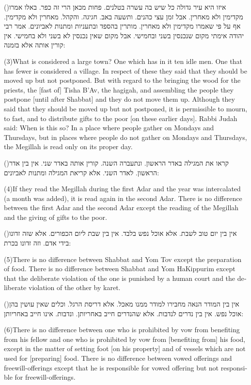 \documentclass[12pt, openany]{book}
\newcommand{\sethebfont}{
\fontsize{10.5pt}{13.1pt} \selectfont
}
\newcommand{\hebeng}[2]{
	{\sethebfont #1\\}
	
	\begin{english}
		#2
	\end{english}
}
\newcommand{\vsnum}[1]{(\hebrewnumeral{#1})\space}
\newcommand{\vsnumeng}[1]{(#1)\space}
\begin{document}
\hebeng{\vsnum{3}איזו היא עיר גדולה כל שיש בה עשרה בטלנים. פחות מכאן הרי זה כפר. באלו אמרו מקדימין ולא מאחרין. אבל זמן עצי כהנים. ותשעה באב. חגיגה. והקהל. מאחרין ולא מקדימין. אף על פי שאמרו מקדימין ולא מאחרין. מותרין בהספד ובתעניות ומתנות לאביונים. אמר רבי יהודה אימתי מקום שנכנסין בשני ובחמישי. אבל מקום שאין נכנסין לא בשני ולא בחמישי. אין קורין אותה אלא בזמנה: 
}{\vsnumeng{3}What is considered a large town? One which has in it ten idle men. One that has fewer is considered a village. In respect of these they said that they should be moved up but not postponed. But with regard to the bringing the wood for the priests, the {[fast of]} Tisha B’Av, the hagigah, and assembling the people they postpone {[until after Shabbat]} and they do not move them up. Although they said that they should be moved up but not postponed, it is permissible to mourn, to fast, and to distribute gifts to the poor {[on these earlier days]}. Rabbi Judah said: When is this so? In a place where people gather on Mondays and Thursdays, but in places where people do not gather on Mondays and Thursdays, the Megillah is read only on its proper day.}%

\hebeng{\vsnum{4}קראו את המגילה באדר הראשון. ונתעברה השנה. קורין אותה באדר שני. אין בין אדר הראשון. לאדר השני. אלא קריאת המגילה ומתנות לאביונים: 
}{\vsnumeng{4}If they read the Megillah during the first Adar and the year was intercalated (a month was added), it is read again in the second Adar. There is no difference between the first Adar and the second Adar except the reading of the Megillah and the giving of gifts to the poor.}%

\hebeng{\vsnum{5}אין בין יום טוב לשבת. אלא אוכל נפש בלבד. אין בין שבת ליום הכפורים. אלא שזה זדונו בידי אדם. וזה זדונו בכרת: 
}{\vsnumeng{5}There is no difference between Shabbat and Yom Tov except the preparation of food. There is no difference between Shabbat and Yom HaKippurim except that the deliberate violation of the one is punished by a human court and the deliberate violation of the other by karet.}%

\hebeng{\vsnum{6}אין בין המודר הנאה מחבירו למודר ממנו מאכל. אלא דריסת הרגל. וכלים שאין עושין בהן אוכל נפש. אין בין נדרים לנדבות. אלא שהנדרים חייב באחריותן. ונדבות. אינו חייב באחריותן: 
}{\vsnumeng{6}There is no difference between one who is prohibited by vow from benefiting from his fellow and one who is prohibited by vow from {[benefiting from]} his food, except in the matter of setting foot {[on his property]} and of vessels which are not used for {[preparing]} food. There is no difference between vowed offerings and freewill-offerings except that he is responsible for vowed offering but not responsible for freewill-offerings.}%
\end{document}
